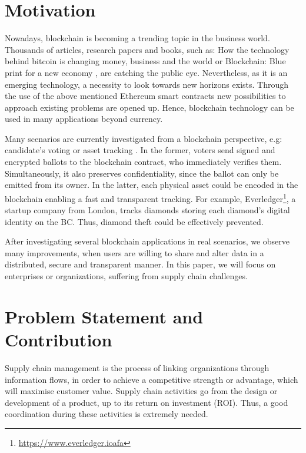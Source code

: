 \section{Motivation}

Nowadays, blockchain is becoming a trending topic in the business world. Thousands of articles, research papers and books, such as: How the technology behind bitcoin is changing money, business and the world \cite{tapscott2016blockchain} or Blockchain: Blue print for a new economy \cite{swan2015blockchain}, are catching the public eye. Nevertheless, as it is an emerging technology, a necessity to look towards new horizons exists. Through the use of the above mentioned Ethereum smart contracts new possibilities to approach existing problems are opened up. Hence, blockchain technology can be used in many applications beyond currency.

Many scenarios are currently investigated from a blockchain perspective, e.g: candidate's voting or asset tracking \cite{abeyratne2016blockchain}. In the former, voters send signed and encrypted ballots to the blockchain contract, who immediately verifies them. Simultaneously, it also preserves confidentiality, since the ballot can only be emitted from its owner. In the latter, each physical asset could be encoded in the blockchain enabling a fast and transparent tracking. For example, Everledger\footnote{\url{https://www.everledger.ioafa}}, a startup company from London, tracks diamonds storing each diamond's digital identity on the BC. Thus, diamond theft could be effectively prevented.

After investigating several blockchain applications in real scenarios, we observe many improvements, when users are willing to share and alter data in a distributed, secure and transparent manner. In this paper, we will focus on enterprises or organizations, suffering from supply chain challenges.

\section{Problem Statement and Contribution}

Supply chain management is the process of linking organizations through information flows, in order to achieve a competitive strength or advantage, which will maximise customer value. Supply chain activities go from the design or development of a product, up to its return on investment (ROI). Thus, a good coordination during these activities is extremely needed.

